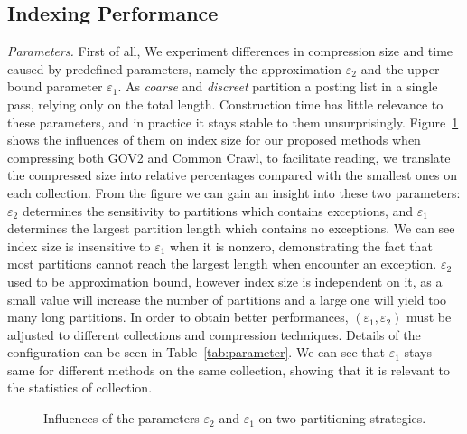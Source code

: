 \documentclass[runningheads]{comsis2}
\begin{document}
\subsection{Indexing Performance}

\textit{Parameters.} First of all, We experiment differences in compression size and time caused by predefined parameters, namely the approximation $\varepsilon_{2}$ and the upper bound parameter $\varepsilon_{1}$.
As \textit{coarse} and \textit{discreet} partition a posting list in a single pass, relying only on the total length.
Construction time has little relevance to these parameters, and in practice it stays stable to them unsurprisingly.
Figure~\ref{fig:parameter} shows the influences of them on index size for our proposed methods when compressing both GOV2 and Common Crawl, to facilitate reading, we translate the compressed size into relative percentages compared with the smallest ones on each collection.
From the figure we can gain an insight into these two parameters: $\varepsilon_{2}$ determines the sensitivity to partitions which contains exceptions, and $\varepsilon_{1}$ determines the largest partition length which contains no exceptions.
We can see index size is insensitive to $\varepsilon_{1}$ when it is nonzero, demonstrating the fact that most partitions cannot reach the largest length when encounter an exception.
$\varepsilon_{2}$ used to be approximation bound, however index size is independent on it, as a small value will increase the number of partitions and a large one will yield too many long partitions.
In order to obtain better performances, $ \left( \varepsilon_1,\varepsilon_2 \right) $ must be adjusted to different collections and compression techniques.
Details of the configuration can be seen in Table~\ref{tab:parameter}.
We can see that $ \varepsilon_1 $ stays same for different methods on the same collection, showing that it is relevant to the statistics of collection.

\begin{figure}
	\centering
	
	\caption{Influences of the parameters $\varepsilon_{2}$ and $\varepsilon_{1}$ on two partitioning strategies.}
	\label{fig:parameter}
\end{figure}
\end{document}
